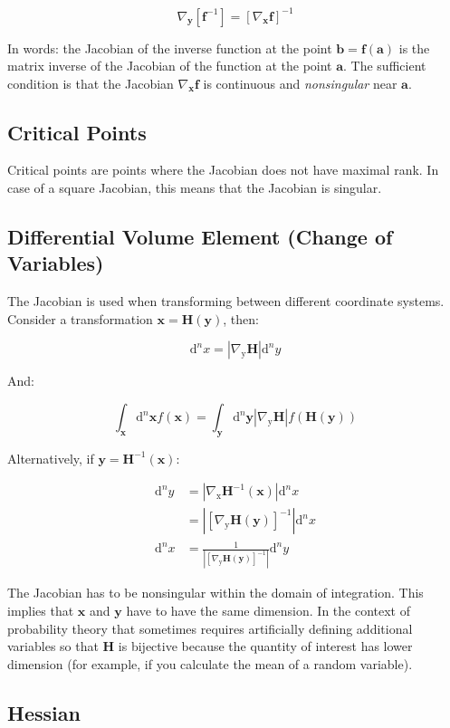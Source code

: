 \begin{equation}
\nabla_\mathbf{y}\left[\mathbf{f}^{-1}\right] = \left[\nabla_\mathbf{x} \mathbf{f} \right]^{-1}
\end{equation}

In words: the Jacobian of the inverse function at the point $\mathbf{b} = \mathbf{f}(\mathbf{a})$ is the matrix inverse of the Jacobian of the function at the point $\mathbf{a}$. The sufficient condition is that the Jacobian $\nabla_\mathbf{x}\mathbf{f}$ is continuous and \textit{nonsingular} near $\mathbf{a}$.

\subsection{Critical Points}
Critical points are points where the Jacobian does not have maximal rank. In case of a square Jacobian, this means that the Jacobian is singular. 

\subsection{Differential Volume Element (Change of Variables)}
The Jacobian is used when transforming between different coordinate systems. Consider a transformation $\mathbf{x} = \mathbf{H}(\mathbf{y})$, then:

\begin{equation}
\mathrm{d}^n x = \left|\nabla_\mathrm{y} \mathbf{H} \right| \mathrm{d}^n y
\end{equation}

And:

\begin{equation}
\int_\mathbf{x} \mathrm{d}^n\mathbf{x} f(\mathbf{x}) = \int_\mathbf{y} \mathrm{d}^n\mathbf{y} \left|\nabla_\mathrm{y} \mathbf{H} \right| f(\mathbf{H}(\mathbf{y}))
\end{equation}

Alternatively, if $\mathbf{y} = \mathbf{H}^{-1}(\mathbf{x})$:

 \begin{equation}
 \begin{array}{rl}
 \mathrm{d}^n y &= \left|\nabla_\mathrm{x} \mathbf{H}^{-1}(\mathbf{x})\right| \mathrm{d}^n x\\
 &= \left| \left[ \nabla_\mathrm{y} \mathbf{H}(\mathbf{y}) \right]^{-1} \right| \mathrm{d}^n x\\
 \mathrm{d}^n x &= \frac{1}{\left| \left[ \nabla_\mathrm{y} \mathbf{H}(\mathbf{y}) \right]^{-1} \right|}  \mathrm{d}^n y 
 \end{array}
 \end{equation}

The Jacobian has to be nonsingular within the domain of integration. This implies that $\mathbf{x}$ and $\mathbf{y}$ have to have the same dimension. In the context of probability theory that sometimes requires artificially defining additional variables so that $\mathbf{H}$ is bijective because the quantity of interest has lower dimension (for example, if you calculate the mean of a random variable). 

\subsection{Hessian}
